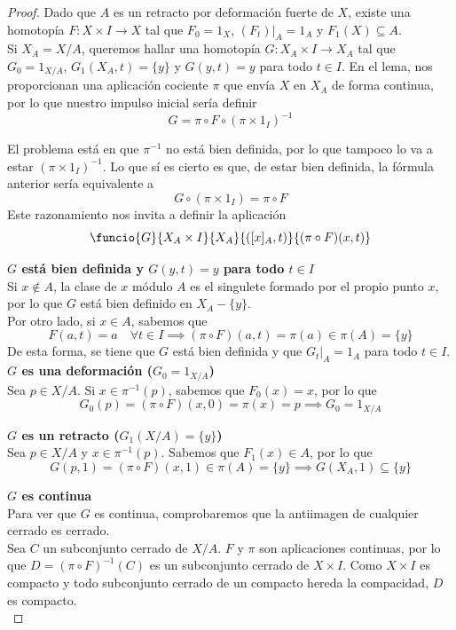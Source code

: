 \begin{proof}
Dado que $A$ es un retracto por deformación fuerte de $X$, existe una homotopía $F: X \times I \longrightarrow X$ tal que $F_0=1_X$, $(F_t)|_A=1_A$ y $F_1(X) \subseteq A$.
\\

Si $X_A=X/A$, queremos hallar una homotopía $G: X_A\times I \longrightarrow X_A$ tal que $G_0=1_{X/A}$, $G_1(X_A,t)=\{y\}$ y $G(y,t)=y$ para todo $t \in I$. En el lema, nos proporcionan una aplicación cociente $\pi$ que envía $X$ en $X_A$ de forma continua, por lo que nuestro impulso inicial sería definir $$G=\pi \circ F \circ (\pi \times 1_I)^{-1}$$

El problema está en que $\pi^{-1}$ no está bien definida, por lo que tampoco lo va a estar $(\pi\times 1_I)^{-1}$. Lo que sí es cierto es que, de estar bien definida, la fórmula anterior sería equivalente a $$G\circ  (\pi \times 1_I)=\pi \circ F$$ Este razonamiento nos invita a definir la aplicación $$\funcio{G}{X_A\times I}{X_A}{([x]_A,t)}{(\pi \circ F)(x,t)}$$

\noindent\textbf{$G$ está bien definida y $G(y,t)=y$ para todo $t \in I$}
\\
Si $x \not\in A$, la clase de $x$ módulo $A$ es el singulete formado por el propio punto $x$, por lo que $G$ está bien definido en $X_A-\{y\}$.
\\

Por otro lado, si $x \in A$, sabemos que $$F(a,t)=a \quad \forall t \in I \implies (\pi\circ F)(a,t)=\pi(a) \in \pi(A)=\{y\}$$ De esta forma, se tiene que $G$ está bien definida y que $G_t|_A=1_A$ para todo $t \in I$.
\\

\noindent\textbf{$G$ es una deformación ($G_0=1_{X/A}$)}
\\
Sea $p \in X/A$. Si $x \in \pi^{-1}(p)$, sabemos que $F_0(x)=x$, por lo que $$G_0(p)=(\pi\circ F)(x,0)=\pi(x)=p \implies G_0=1_{X/A}$$

\noindent\textbf{$G$ es un retracto ($G_1(X/A)=\{y\}$)}\\
Sea $p \in X/A$ y $x \in \pi^{-1}(p)$. Sabemos que $F_1(x) \in A$, por lo que \[G(p,1)=(\pi \circ F)(x,1)\in \pi(A)=\{y\} \implies G(X_A,1)\subseteq\{y\}\]

\noindent\textbf{$G$ es continua}\\
Para ver que $G$ es continua, comprobaremos que la antiimagen de cualquier cerrado es cerrado.
\\

Sea $C$ un subconjunto cerrado de $X/A$. $F$ y $\pi$ son aplicaciones continuas, por lo que $D=(\pi\circ F)^{-1}(C)$ es un subconjunto cerrado de $X\times I$. Como $X\times I$ es compacto y todo subconjunto cerrado de un compacto hereda la compacidad, $D$ es compacto.
\\


\end{proof}
